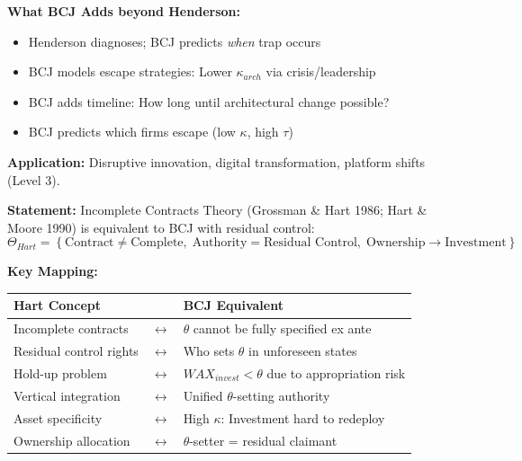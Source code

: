 \begin{tcolorbox}[colback=green!5!white, colframe=green!75!black,
    title=Theorem BCJ-T37: Henderson Innovation Architecture as Special Case]
\textbf{What BCJ Adds beyond Henderson:}
\begin{itemize}[nosep]
\item Henderson diagnoses; BCJ predicts \textit{when} trap occurs
\item BCJ models escape strategies: Lower $\kappa_{arch}$ via crisis/leadership
\item BCJ adds timeline: How long until architectural change possible?
\item BCJ predicts which firms escape (low $\kappa$, high $\tau$)
\end{itemize}

\textbf{Application:} Disruptive innovation, digital transformation, platform shifts (Level 3).
\end{tcolorbox}

\begin{tcolorbox}[colback=green!5!white, colframe=green!75!black,
    title=Theorem BCJ-T38: Hart Incomplete Contracts as Special Case]
\textbf{Statement:} Incomplete Contracts Theory (Grossman \& Hart 1986; Hart \& Moore 1990) is equivalent to BCJ with residual control:
\begin{equation}
\Theta_{Hart} = \left\{\text{Contract} \neq \text{Complete}, \; \text{Authority} = \text{Residual Control}, \; \text{Ownership} \to \text{Investment}\right\}
\end{equation}

\textbf{Key Mapping:}
\begin{center}
\begin{tabular}{lcl}
\toprule
\textbf{Hart Concept} & & \textbf{BCJ Equivalent} \\
\midrule
Incomplete contracts & $\leftrightarrow$ & $\theta$ cannot be fully specified ex ante \\
Residual control rights & $\leftrightarrow$ & Who sets $\theta$ in unforeseen states \\
Hold-up problem & $\leftrightarrow$ & $WAX_{invest} < \theta$ due to appropriation risk \\
Vertical integration & $\leftrightarrow$ & Unified $\theta$-setting authority \\
Asset specificity & $\leftrightarrow$ & High $\kappa$: Investment hard to redeploy \\
Ownership allocation & $\leftrightarrow$ & $\theta$-setter = residual claimant \\
\bottomrule
\end{tabular}
\end{center}


\end{tcolorbox}
